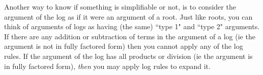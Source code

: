 \documentclass{ximera}
\begin{document}
    Another way to know if something is simplifiable or not, is to consider the argument of the log as if it were an argument of a root. Just like roots, you can think of arguments of logs as having (the same) ``type 1" and ``type 2" arguments. If there are any addition or subtraction of terms in the argument of a log (ie the argument is not in fully factored form) then you cannot apply any of the log rules. If the argument of the log has all products or division (ie the argument is in fully factored form), \textit{then} you may apply log rules to expand it.
    
%    
%
%
%
%
%
\end{document}
